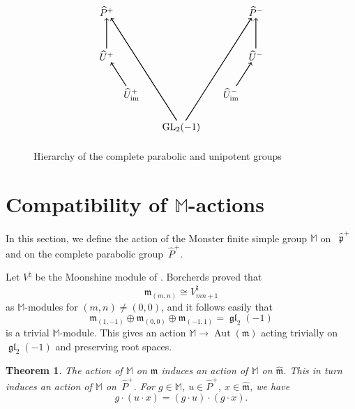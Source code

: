 \documentclass[11pt,letterpaper]{amsart}
\newcounter{thecounter}
\numberwithin{thecounter}{section}
\newtheorem{theorem}[thecounter]{Theorem}
\theoremstyle{definition}
\DeclareMathOperator{\gl}{\mathfrak{gl}}
\DeclareMathOperator{\Aut}{Aut}
\newcommand{\M}{{\mathbb M}}
\newcommand{\Php}{{\widehat{P}^+}}
\newcommand{\m}{{\mathfrak{m}}}
\newcommand{\mhat}{{\widehat{\mathfrak{m}}}}
\begin{document}
\begin{figure}[ht]
\centering
\[
\begin{tikzpicture}[
  every node/.style={inner sep=2pt},
  incl/.style={->, thick}
]
\node (Pp) at (-2.7,4.2) {$\widehat P^{+}$};
\node (Pm) at ( 2.7,4.2) {$\widehat P^{-}$};

\node (Up) at (-2.7,2.6) {$\widehat U^{+}$};
\node (Um) at ( 2.7,2.6) {$\widehat U^{-}$};

\node (Uimp) at (-1.8,1.2) {$\widehat U^{+}_{\mathrm{im}}$};
\node (Uimm) at ( 1.8,1.2) {$\widehat U^{-}_{\mathrm{im}}$};

\node (G) at (0,0) {$\mathrm{GL}_2(-1)$};

\draw[incl] (Up) -- (Pp);
\draw[incl] (Um) -- (Pm);

\draw[incl] (Uimp) -- (Up);
\draw[incl] (Uimm) -- (Um);

\draw[incl] (G) -- (Pp);
\draw[incl] (G) -- (Pm);
\end{tikzpicture}
\]
\caption{Hierarchy of the complete parabolic  and unipotent groups}
\label{fig:complete-parabolic-groups}
\end{figure}
\section{Compatibility of $\M$-actions}\label{S-compat}
In this section, we define the action of the Monster finite simple group $\M$ on ~$\widehat{\mathfrak p}^+$ and on the complete parabolic group~$\Php$. 

Let $V^\natural$ be the Moonshine module of \cite{FLM}. Borcherds proved  \cite{BoInvent} that $$\mathfrak m_{(m,n)}\cong V^\natural_{mn+1}$$ as  $\mathbb{M}$-modules for $(m,n)\neq (0,0)$, and it follows easily that
$$\m_{(1,-1)}\oplus \m_{(0,0)}\oplus \m_{(-1,1)}= \gl_2(-1)$$
 is a trivial $\mathbb{M}$-module. This gives an action $\mathbb{M}   \to    \Aut(\mathfrak m)$ acting trivially on $\gl_2(-1)$ and preserving root spaces.


\begin{theorem}\label{action} The action of $\M$ on $\mathfrak m$ induces an action of $\M$ on $\mhat$. This in turn induces an action of $\M$ on~$\Php$. 
For $g\in\M$, $u\in\Php$, $x\in\mhat$, we have
$$ g\cdot(u\cdot x) = (g\cdot u)\cdot (g\cdot x).$$
\end{theorem}
\end{document}
